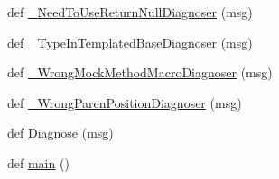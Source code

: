 \begin{DoxyCompactItemize}
\item 
def \mbox{\hyperlink{namespacescripts_1_1gmock__doctor_aa8ff5292547ab4ff5a3e4553858309c7}{\+\_\+\+Need\+To\+Use\+Return\+Null\+Diagnoser}} (msg)
\item 
def \mbox{\hyperlink{namespacescripts_1_1gmock__doctor_a9241b019bd0c455582ed243bd2c0a196}{\+\_\+\+Type\+In\+Templated\+Base\+Diagnoser}} (msg)
\item 
def \mbox{\hyperlink{namespacescripts_1_1gmock__doctor_a2c0900fea0e3c4a3556b19bd9ed7126c}{\+\_\+\+Wrong\+Mock\+Method\+Macro\+Diagnoser}} (msg)
\item 
def \mbox{\hyperlink{namespacescripts_1_1gmock__doctor_aff422d37d1505c339b2cc861f37aa869}{\+\_\+\+Wrong\+Paren\+Position\+Diagnoser}} (msg)
\item 
def \mbox{\hyperlink{namespacescripts_1_1gmock__doctor_a7a23f6a3a8dc361e0b24afe89daf4b80}{Diagnose}} (msg)
\item 
def \mbox{\hyperlink{namespacescripts_1_1gmock__doctor_a1bededdb0621eefd9ac1d1d668142400}{main}} ()
\end{DoxyCompactItemize}
